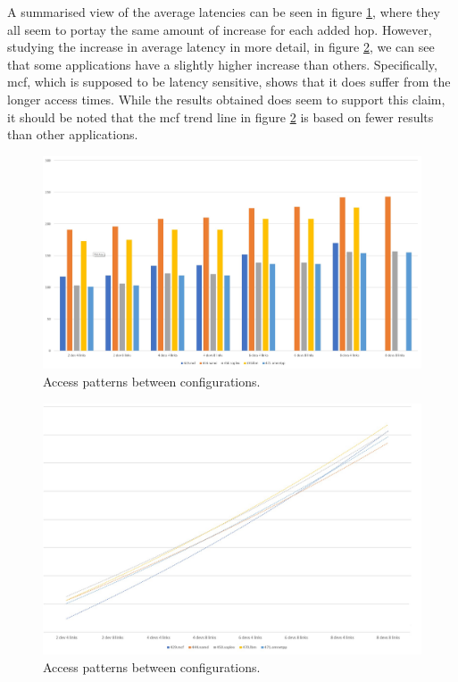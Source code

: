 A summarised view of the average latencies can be seen in figure \ref{All-apps-latency}, where they all seem to portay the same amount of increase for each added hop. However, studying the increase in average latency in more detail, in figure \ref{All-apps-latency-trends}, we can see that some applications have a slightly higher increase than others. Specifically, mcf, which is supposed to be latency sensitive, shows that it does suffer from the longer access times. While the results obtained does seem to support this claim, it should be noted that the mcf trend line in figure \ref{All-apps-latency-trends} is based on fewer results than other applications.
\bigskip

\begin{figure}[!ht]
    \centering
    \includegraphics[width=0.75\linewidth]{figure/all-apps-latencies.jpg}
    \caption{Access patterns between configurations.}
    \label{All-apps-latency}
\end{figure}

\begin{figure}[!ht]
    \centering
    \includegraphics[width=0.75\linewidth]{figure/all-apps-latencies-trends.jpg}
    \caption{Access patterns between configurations.}
    \label{All-apps-latency-trends}
\end{figure}

